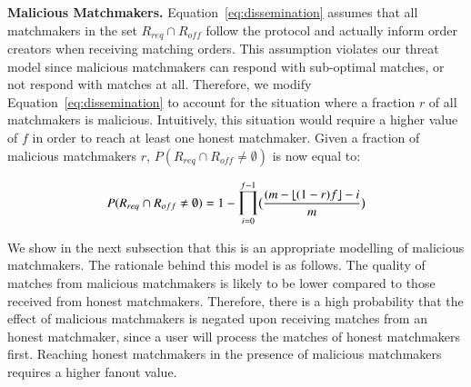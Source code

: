 
\textbf{Malicious Matchmakers.}
Equation~\ref{eq:dissemination} assumes that all matchmakers in the set $ R_{req} \cap R_{off} $ follow the protocol and actually inform order creators when receiving matching orders.
This assumption violates our threat model since malicious matchmakers can respond with sub-optimal matches, or not respond with matches at all.
Therefore, we modify Equation~\ref{eq:dissemination} to account for the situation where a fraction $ r $ of all matchmakers is malicious.
Intuitively, this situation would require a higher value of $ f $ in order to reach at least one honest matchmaker.
Given a fraction of malicious matchmakers $ r $, $ P(R_{req} \cap R_{off} \neq \emptyset) $ is now equal to:

\begin{equation}
P(R_{req} \cap R_{off} \neq \emptyset) = 1 - \mathlarger{\prod}_{i=0}^{f-1} \big(\frac{(m - \left \lfloor{(1-r)f}\right \rfloor - i}{m}\big)
\label{eq:malicious_dissemination}
\end{equation}

We show in the next subsection that this is an appropriate modelling of malicious matchmakers.
The rationale behind this model is as follows.
The quality of matches from malicious matchmakers is likely to be lower compared to those received from honest matchmakers.
Therefore, there is a high probability that the effect of malicious matchmakers is negated upon receiving matches from an honest matchmaker, since a user will process the matches of honest matchmakers first.
Reaching honest matchmakers in the presence of malicious matchmakers requires a higher fanout value.

